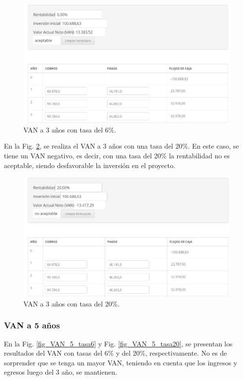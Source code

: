 \documentclass[12pt,a4paper]{book}
\begin{document}
\begin{figure} [H]
\centering
\includegraphics[width= 15 cm]{../figuras/VAN_3anios_6rentabilidad.jpg}
\caption{VAN a 3 años con tasa del 6\%.}
\label{fig_VAN_3_tasa6}
\end{figure}

En la Fig. \ref{fig_VAN_3_tasa20}, se realiza el VAN a 3 años con una tasa del 20\%. En este caso, se tiene un VAN negativo, es decir, con una tasa del 20\% la rentabilidad no es aceptable, siendo desfavorable la inversión en el proyecto.

\begin{figure} [H]
\centering
\includegraphics[width= 13 cm]{../figuras/VAN_3anios_20rentabilidad.jpg}
\caption{VAN a 3 años con tasa del 20\%.}
\label{fig_VAN_3_tasa20}
\end{figure}

\subsubsection{VAN a 5 años}

En la Fig. \ref{fig_VAN_5_tasa6} y Fig. \ref{fig_VAN_5_tasa20}, se presentan los resultados del VAN con tasas del 6\% y del 20\%, respectivamente. No es de sorprender que se tenga un mayor VAN, teniendo en cuenta que los ingresos y egresos luego del 3 año, se mantienen.
\end{document}
